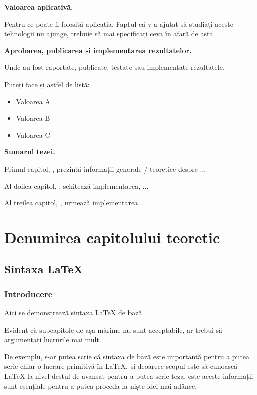 \documentclass[a4paper,12pt]{report}
\begin{document}
\textbf{Valoarea aplicativă.}

Pentru ce poate fi folosită aplicația.
Faptul că v-a ajutat să studiați aceste tehnologii nu ajunge, 
trebuie să mai specificați ceva în afară de asta.

\textbf{Aprobarea, publicarea și implementarea rezultatelor.}

Unde au fost raportate, publicate, testate sau implementate rezultatele.

Puteți face și astfel de listă:
\begin{itemize}
    \item Valoarea A
    \item Valoarea B
    \item Valoarea C
\end{itemize}

\textbf{Sumarul tezei.}

Primul capitol, , prezintă informații generale / teoretice despre ...

Al doilea capitol, , schițează implementarea, ...

Al treilea capitol, , urmează implementarea ...

\chapter{Denumirea capitolului teoretic}\label{intro_chapter_title}

\section{Sintaxa \LaTeX{}}

\subsection{Introducere}

Aici se demonstrează sintaxa \LaTeX{} de bază.

Evident că subcapitole de așa mărime nu sunt acceptabile, 
ar trebui să argumentați lucrurile mai mult.

De exemplu, s-ar putea scrie că sintaxa de bază este importantă
pentru a putea scrie chiar o lucrare primitivă în \LaTeX{}, și deoarece
scopul este să cunoască \LaTeX{} la nivel destul de avansat pentru a putea
scrie teza, este aceste informații sunt esențiale pentru a putea proceda la
niște idei mai adânce.
\end{document}
